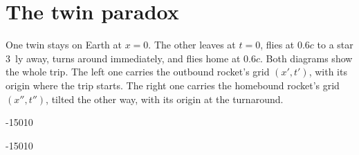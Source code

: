 \documentclass{handout}
\begin{document}
\newpage
\section{The twin paradox}

One twin stays on Earth at $x=0$. The other leaves at $t=0$, flies at $0.6c$ to
a star 3~ly away, turns around immediately, and flies home at $0.6c$. Both
diagrams show the whole trip. The left one carries the outbound rocket's grid
$(x',t')$, with its origin where the trip starts. The right one carries the
homebound rocket's grid $(x'',t'')$, tilted the other way, with its origin at
the turnaround.

\begin{center}
\begin{spacetime}[0.9]{-1}{5}{0}{10}
\end{spacetime}
\hspace{1.2cm}
\begin{spacetime}[0.9]{-1}{5}{0}{10}
\end{spacetime}
\end{center}
\end{document}
